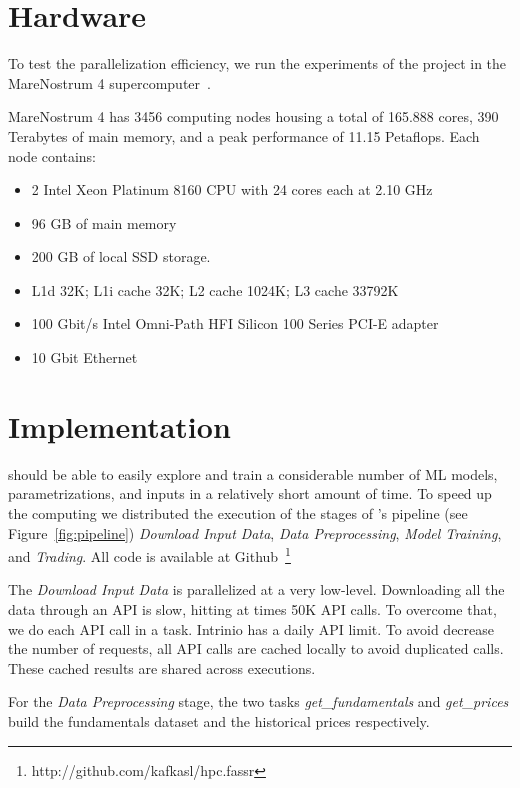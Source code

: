 \section{Hardware}

To test the parallelization efficiency, we run the experiments of the project in the MareNostrum 4 supercomputer~\cite{mn4}. 

MareNostrum 4 has 3456 computing nodes housing a total of 165.888 cores, 390 Terabytes of main memory, and a peak performance of 11.15 Petaflops. Each node contains:

\begin{itemize}
\item 2 Intel Xeon Platinum 8160 CPU with 24 cores each at 2.10 GHz
\item 96 GB of main memory
\item 200 GB of local SSD storage.
\item L1d 32K; L1i cache 32K; L2 cache 1024K; L3 cache 33792K
\item 100 Gbit/s Intel Omni-Path HFI Silicon 100 Series PCI-E adapter
\item 10 Gbit Ethernet
\end{itemize}
 
\section{Implementation}

\HPCsys should be able to easily explore and train a considerable number of ML models, parametrizations, and inputs in a relatively short amount of time. To speed up the computing we distributed the execution of the stages of \HPCsys's pipeline (see Figure~\ref{fig:pipeline}) \textit{Download Input Data}, \textit{Data Preprocessing}, \textit{Model Training}, and \textit{Trading}.  All \HPCsys code is available at Github~\footnote{http://github.com/kafkasl/hpc.fassr}

The \textit{Download Input Data} is parallelized at a very low-level. Downloading all the data through an API is slow, hitting at times 50K API calls. To overcome that, we do each API call in a task. %
Intrinio has a daily API limit. To avoid decrease the number of requests, all API calls are cached locally to avoid duplicated calls. These cached results are shared across executions.

For the \textit{Data Preprocessing} stage, the two tasks \textit{get\_fundamentals} and \textit{get\_prices} build the fundamentals dataset and the historical prices respectively. 

